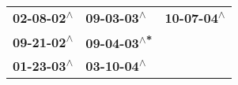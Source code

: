 \begin{supertabular}{lll}
 \textbf{02-08-02\textsuperscript{$\wedge$}} &   \textbf{09-03-03\textsuperscript{$\wedge$}} &  \textbf{10-07-04\textsuperscript{$\wedge$}} \\
 \textbf{09-21-02\textsuperscript{$\wedge$}} &  \textbf{09-04-03\textsuperscript{$\wedge$*}} &                                              \\
 \textbf{01-23-03\textsuperscript{$\wedge$}} &   \textbf{03-10-04\textsuperscript{$\wedge$}} &                                              \\
\end{supertabular}
